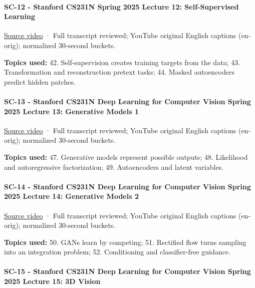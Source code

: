 \paragraph{SC-12 - Stanford CS231N Spring 2025 Lecture 12: Self-Supervised Learning}\label{sc-12---stanford-cs231n-spring-2025-lecture-12-self-supervised-learning}

\href{https://www.youtube.com/watch?v=4howBU7THbM}{Source video} · Full transcript reviewed; YouTube original English captions (en-orig); normalized 30-second buckets.

\textbf{Topics used:} 42. Self-supervision creates training targets from the data; 43. Transformation and reconstruction pretext tasks; 44. Masked autoencoders predict hidden patches.

\paragraph{SC-13 - Stanford CS231N Deep Learning for Computer Vision Spring 2025 Lecture 13: Generative Models 1}\label{sc-13---stanford-cs231n-deep-learning-for-computer-vision-spring-2025-lecture-13-generative-models-1}

\href{https://www.youtube.com/watch?v=zbHXQRUNlH0}{Source video} · Full transcript reviewed; YouTube original English captions (en-orig); normalized 30-second buckets.

\textbf{Topics used:} 47. Generative models represent possible outputs; 48. Likelihood and autoregressive factorization; 49. Autoencoders and latent variables.

\paragraph{SC-14 - Stanford CS231N Deep Learning for Computer Vision Spring 2025 Lecture 14: Generative Models 2}\label{sc-14---stanford-cs231n-deep-learning-for-computer-vision-spring-2025-lecture-14-generative-models-2}

\href{https://www.youtube.com/watch?v=Edr4uZFh4EE}{Source video} · Full transcript reviewed; YouTube original English captions (en-orig); normalized 30-second buckets.

\textbf{Topics used:} 50. GANs learn by competing; 51. Rectified flow turns sampling into an integration problem; 52. Conditioning and classifier-free guidance.

\paragraph{SC-15 - Stanford CS231N Deep Learning for Computer Vision Spring 2025 Lecture 15: 3D Vision}\label{sc-15---stanford-cs231n-deep-learning-for-computer-vision-spring-2025-lecture-15-3d-vision}

